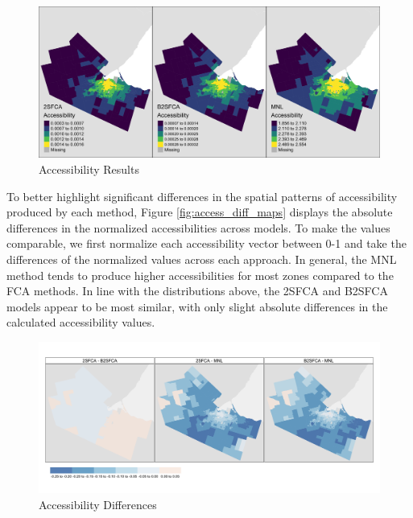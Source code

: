 \documentclass[]{elsarticle} %
\begin{document}
\begin{figure}
\includegraphics[width=1\linewidth]{./img/access_maps} \caption{\label{fig:access_maps}Accessibility Results}\label{fig:plot access_maps}
\end{figure}

To better highlight significant differences in the spatial patterns of
accessibility produced by each method, Figure \ref{fig:access_diff_maps}
displays the absolute differences in the normalized accessibilities
across models. To make the values comparable, we first normalize each
accessibility vector between 0-1 and take the differences of the
normalized values across each approach. In general, the MNL method tends
to produce higher accessibilities for most zones compared to the FCA
methods. In line with the distributions above, the 2SFCA and B2SFCA
models appear to be most similar, with only slight absolute differences
in the calculated accessibility values.

\begin{figure}
\includegraphics[width=1\linewidth]{./img/access_diff_maps} \caption{\label{fig:access_diff_maps}Accessibility Differences}\label{fig:plot access_diff_maps}
\end{figure}
\end{document}
